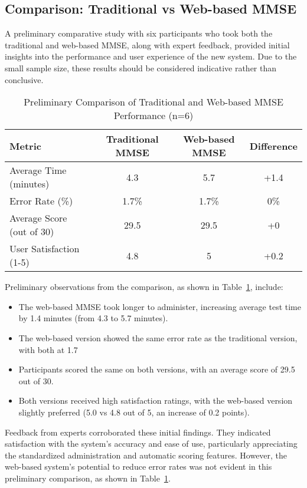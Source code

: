 \subsection{Comparison: Traditional vs Web-based MMSE}

A preliminary comparative study with six participants who took both the traditional and web-based MMSE, along with expert feedback, provided initial insights into the performance and user experience of the new system. Due to the small sample size, these results should be considered indicative rather than conclusive.

\begin{table}[ht]
\centering
\begin{tabular}{|l|c|c|c|}
\hline
\textbf{Metric} & \textbf{Traditional MMSE} & \textbf{Web-based MMSE} & \textbf{Difference} \\
\hline
Average Time (minutes) & 4.3 & 5.7 & +1.4 \\
Error Rate (\%) & 1.7\% & 1.7\% & 0\% \\
Average Score (out of 30) & 29.5 & 29.5 & +0 \\
User Satisfaction (1-5) & 4.8 & 5 & +0.2 \\
\hline
\end{tabular}
\caption{Preliminary Comparison of Traditional and Web-based MMSE Performance (n=6)}
\label{tab:mmse_comparison}
\end{table}

Preliminary observations from the comparison, as shown in Table~\ref{tab:mmse_comparison}, include:
\begin{itemize}
\item The web-based MMSE took longer to administer, increasing average test time by 1.4 minutes (from 4.3 to 5.7 minutes).
\item The web-based version showed the same error rate as the traditional version, with both at 1.7%
\item Participants scored the same on both versions, with an average score of 29.5 out of 30.
\item Both versions received high satisfaction ratings, with the web-based version slightly preferred (5.0 vs 4.8 out of 5, an increase of 0.2 points).
\end{itemize}
Feedback from experts corroborated these initial findings. They indicated satisfaction with the system's accuracy and ease of use, particularly appreciating the standardized administration and automatic scoring features. However, the web-based system's potential to reduce error rates was not evident in this preliminary comparison, as shown in Table~\ref{tab:mmse_comparison}.

